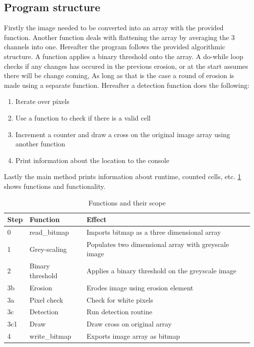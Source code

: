 \documentclass[a4paper, english]{article}
\numberwithin{equation}{section}
\begin{document}
\subsection{Program structure}
Firstly the image needed to be converted into an array with the provided function. Another function deals with flattening the array by averaging the 3 channels into one. Hereafter the program follows the provided algorithmic structure. A function applies a binary threshold onto the array. A do-while loop checks if any changes has occured in the previous erosion, or at the start assumes there will be change coming, As long as that is the case a round of erosion is made using a separate function. Hereafter a detection function does the following:
\begin{enumerate}
    \item Iterate over pixels
    \item Use a function to check if there is a valid cell
    \item Increment a counter and draw a cross on the original image array using another function
    \item Print information about the location to the console
\end{enumerate}
Lastly the main method prints information about runtime, counted cells, etc. \cref{tbl:func} shows functions and functionality.
\begin{table}
    \centering
    \caption{Functions and their scope}\label{tbl:func}
    \begin{tabular}{lll}
        \toprule
        Step & Function         & Effect                                               \\
        \midrule
        0    & read\_bitmap     & Imports bitmap as a three dimensional array          \\
        1    & Grey-scaling      & Populates two dimensional array with greyscale image \\
        2    & Binary threshold & Applies a binary threshold on the greyscale image    \\
        3b   & Erosion          & Erodes image using erosion element                   \\
        3a   & Pixel check      & Check for white pixels                               \\
        3c   & Detection        & Run detection routine                                \\
        3c1  & Draw             & Draw cross on original array                         \\
        4    & write\_bitmap    & Exports image array as bitmap                        \\
        \bottomrule
    \end{tabular}
\end{table}
\end{document}
